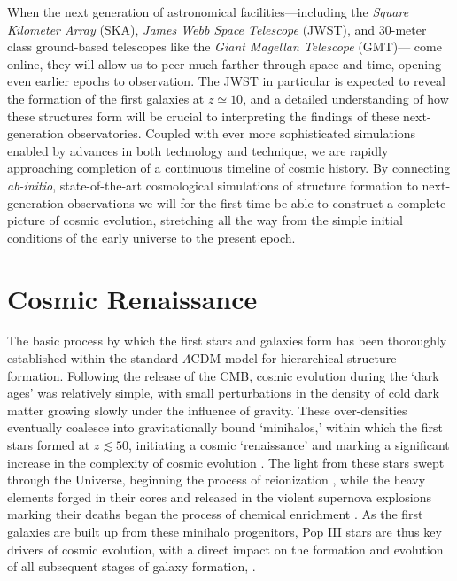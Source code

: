\documentclass[../thesis.tex]{subfiles}
\begin{document}
When the next generation of astronomical facilities---including the \textit{Square Kilometer Array} (SKA), \textit{James Webb Space Telescope} (JWST), and 30-meter class ground-based telescopes like the \textit{Giant Magellan Telescope} (GMT)--- come online, they will allow us to peer much farther through space and time, opening even earlier epochs to observation.
The JWST in particular is expected to reveal the formation of the first galaxies at $z\simeq10$, and a detailed understanding of how these structures form will be crucial to interpreting the findings of these next-generation observatories.
Coupled with ever more sophisticated simulations enabled by advances in both technology and technique, we are rapidly approaching completion of a continuous timeline of cosmic history. 
By connecting \textit{ab-initio}, state-of-the-art cosmological simulations of structure formation to next-generation observations we will for the first time be able to construct a complete picture of cosmic evolution, stretching all the way from the simple initial conditions of the early universe to the present epoch.

\section{Cosmic Renaissance}

The basic process by which the first stars and galaxies form has been thoroughly established within the standard $\Lambda$CDM model for hierarchical structure formation.
Following the release of the CMB, cosmic evolution during the `dark ages' was relatively simple, with small perturbations in the density of cold dark matter 
growing slowly under the influence of gravity.
These over-densities eventually coalesce into gravitationally bound `minihalos,' within which the first stars formed at $z\lesssim50$, initiating a cosmic `renaissance' and marking a significant increase in the complexity of cosmic evolution \citep{BarkanaLoeb2001, Miralda-Escude2003, Brommetal2009, Loeb2010}.
The light from these stars swept through the Universe, beginning the process of reionization \citep[e.g.,][]{Meiksin2009}, while the heavy elements forged in their cores and released in the violent supernova explosions marking their deaths began the process of chemical enrichment \citep[e.g.,][]{KarlssonBrommHawthorn2013}.
As the first galaxies are built up from these minihalo progenitors, Pop III stars are thus key drivers of cosmic evolution, with a direct impact on the formation and evolution of all subsequent stages of galaxy formation, \citep[e.g.,][]{Bromm2013}.  
\end{document}
